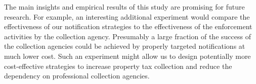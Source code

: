 \documentclass[12pt]{article}
\begin{document}

The main insights and empirical results of this study are promising
for future research. For example, an interesting additional experiment would
compare the effectiveness of our notification strategies to the effectiveness
of the enforcement activities by the collection agency. Presumably a large fraction
of the success of the collection agencies could be achieved by properly targeted notifications 
at much lower cost. Such an experiment might  allow us to design potentially more cost-effective strategies to increase property tax collection and reduce the dependency on professional collection agencies.


\newpage





\end{document}
